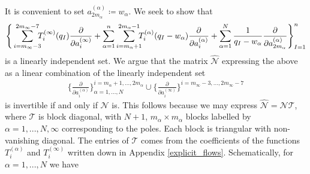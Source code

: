 \documentclass[a4paper,12pt,reqno]{amsart}
\numberwithin{equation}{section}
\numberwithin{counter2}{section}
\begin{document}
It is convenient to set $a_{2m_\alpha}^{(\alpha)} \coloneqq w_\alpha$.  
We seek to show that
\begin{align}
\Bigg\{ \sum_{i = m_\infty - 3}^{2m_\infty-7} \hspace{-2mm} T_i^{(\infty)}(q_I)\frac{\partial}{\partial a_i^{(\infty)}} + \sum_{\alpha = 1}^{n} \sum_{i = m_\alpha+1}^{2m_\alpha - 1} \hspace{-2mm} T_i^{(\alpha)}(q_I-w_\alpha)\frac{\partial}{\partial {a_i^{(\alpha)}}} + \sum_{\alpha = 1}^{N} \frac{1} {q_I-w_\alpha}\frac{\partial}{\partial a_{2m_\alpha}^{(\alpha)}} \Bigg\}_{I=1}^{n}
\end{align}
is a linearly independent set.  We argue that the matrix $\hat{\mathcal{N}}$ expressing the above as a linear combination of the linearly independent set
\begin{align}
\Bigg\{\frac{\partial}{\partial {a_i^{(\alpha)}}} \Bigg\}_{\alpha = 1,...,N}^{i = m_\alpha+1,...,2m_\alpha} \cup \Bigg\{   \frac{\partial}{\partial a_i^{(\infty)}}\Bigg\}^{i=m_\infty-3,...,2m_\infty-7} 
\end{align}
is invertible if and only if $\mathcal{N}$ is.  This follows because we may express $\hat{\mathcal{N}} = \mathcal{N}\mathcal{T}$, where $\mathcal{T}$ is block diagonal,  with $N+1$,  $m_\alpha \times m_\alpha$ blocks labelled by $\alpha = 1,...,N,\infty$ corresponding to the poles.  Each block is triangular with non-vanishing diagonal.  The entries of $\mathcal{T}$ comes from the coefficients of the functions $T_i^{(\alpha)}$ and $T_i^{(\infty)}$ written down in Appendix \ref{explicit_flows}.  Schematically,  for $\alpha = 1,...,N$ we have
\end{document}
